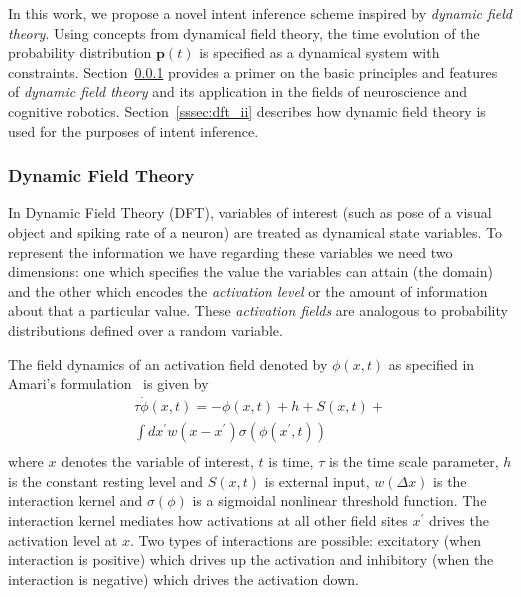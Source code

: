 In this work, we propose a novel intent inference scheme inspired by \textit{dynamic field theory}. Using concepts from dynamical field theory, the time evolution of the probability distribution $\boldsymbol{p}(t)$ is specified as a dynamical system with constraints. Section~\ref{sssec:dft} provides a primer on the basic principles and features of \textit{dynamic field theory} and its application in the fields of neuroscience and cognitive robotics. Section~\ref{sssec:dft_ii} describes how dynamic field theory is used for the purposes of intent inference. 

\subsubsection{Dynamic Field Theory}\label{sssec:dft}

In Dynamic Field Theory (DFT), variables of interest (such as pose of a visual object and spiking rate of a neuron) are treated as dynamical state variables. To represent the information we have regarding these variables we need two dimensions: one which specifies the value the variables can attain (the domain) and the other which encodes the \textit{activation level} or the amount of information about that a particular value. These \textit{activation fields} are analogous to probability distributions defined over a random variable. 

The field dynamics of an activation field denoted by $\phi(x, t)$ as specified in Amari's formulation~\cite{amari1977dynamics} is given by 
\begin{multline}
\tau\dot{\phi}(x,t) = -\phi(x,t) + h + S(x,t) + \\ \int\limits_{}^{}dx^{\prime}w(x-x^{\prime})\sigma(\phi(x^{\prime}, t)) 
\end{multline} 
where $x$ denotes the variable of interest, $t$ is time, $\tau$ is the time scale parameter, $h$ is the constant resting level and $S(x,t)$ is external input, $w(\Delta x)$ is the interaction kernel and $\sigma(\phi)$ is a sigmoidal nonlinear threshold function. The interaction kernel mediates how activations at all other field sites $x^\prime$ drives the activation level at $x$. Two types of interactions are possible: excitatory (when interaction is positive) which drives up the activation and inhibitory (when the interaction is negative) which drives the activation down. 

